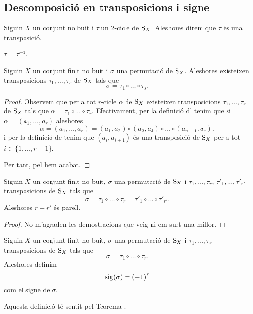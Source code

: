 \documentclass[../Apunts.tex]{subfiles}
\begin{document}
	\subsection{Descomposició en transposicions i signe}
	\begin{definition}[Transposició]
		\label{def:transposició}
		Siguin \(X\) un conjunt no buit i \(\tau\) un \(2\)-cicle de \(\operatorname{S}_{X}\). Aleshores direm que \(\tau\) és una transposició.
	\end{definition}
	\begin{observation}
		\(\tau=\tau^{-1}\).
	\end{observation}
	\begin{proposition}
		Siguin \(X\) un conjunt finit no buit i \(\sigma\) una permutació de \(\operatorname{S}_{X}\). Aleshores existeixen transposicions \(\tau_{1},\dots,\tau_{s}\) de \(\operatorname{S}_{X}\) tals que
		\[\sigma=\tau_{1}\circ\dots\circ\tau_{s}.\]
		\begin{proof}
			Observem que per a tot \(r\)-cicle \(\alpha\) de \(\operatorname{S}_{X}\) existeixen transposicions \(\tau_{1},\dots,\tau_{r}\) de \(\operatorname{S}_{X}\) tals que \(\alpha=\tau_{1}\circ\dots\circ\tau_{r}\). Efectivament, per la definició d' tenim que si \(\alpha=(a_{1},\dots,a_{r})\) aleshores
			\[\alpha=(a_{1},\dots,a_{r})=(a_{1},a_{2})\circ(a_{2},a_{3})\circ\dots\circ(a_{n-1},a_{r}),\]
			i per la definició de  tenim que \((a_{i},a_{i+1})\) és una transposició de \(\operatorname{S}_{X}\) per a tot \(i\in\{1,\dots,r-1\}\).
			
			Per tant, pel  hem acabat.
		\end{proof}
	\end{proposition}
	\begin{theorem}
		\label{thm:paritat nombre de transposicions en la descomposició d'una permutació}
		\label{thm:signe d'una permutació}
		Siguin \(X\) un conjunt finit no buit, \(\sigma\) una permutació de \(\operatorname{S}_{X}\) i \(\tau_{1},\dots,\tau_{r}\), \(\tau'_{1},\dots,\tau'_{r'}\) transposicions de \(\operatorname{S}_{X}\) tals que
		\[\sigma=\tau_{1}\circ\dots\circ\tau_{r}=\tau'_{1}\circ\dots\circ\tau'_{r'}.\]
		Aleshores \(r-r'\) és parell.
		\begin{proof}
			No m'agraden les demostracions que veig ni em surt una millor.%
		\end{proof}
	\end{theorem}
	\begin{definition}
		\label{def:signe d'una permutació}
		Siguin \(X\) un conjunt finit no buit, \(\sigma\) una permutació de \(\operatorname{S}_{X}\) i \(\tau_{1},\dots,\tau_{r}\) transposicions de \(\operatorname{S}_{X}\) tals que
		\[\sigma=\tau_{1}\circ\dots\circ\tau_{r}.\]
		Aleshores definim
		\[\operatorname{sig}(\sigma)={(-1)}^{r}\]
		com el signe de \(\sigma\).
		
		Aquesta definició té sentit pel Teorema .
	\end{definition}
\end{document}
